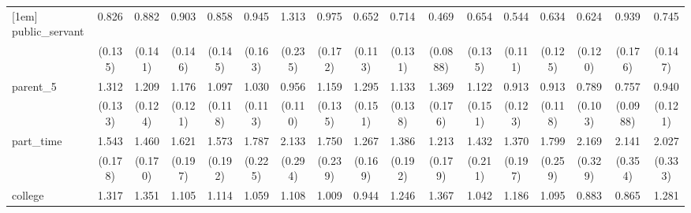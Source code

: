 {\begin{tabular}{l*{16}{c}}
[1em]
public\_servant      &       0.826         &       0.882         &       0.903         &       0.858         &       0.945         &       1.313         &       0.975         &       0.652\sym{*}  &       0.714         &       0.469\sym{***}&       0.654\sym{*}  &       0.544\sym{**} &       0.634\sym{*}  &       0.624\sym{*}  &       0.939         &       0.745         \\
                    &     (0.135)         &     (0.141)         &     (0.146)         &     (0.145)         &     (0.163)         &     (0.235)         &     (0.172)         &     (0.113)         &     (0.131)         &    (0.0888)         &     (0.135)         &     (0.111)         &     (0.125)         &     (0.120)         &     (0.176)         &     (0.147)         \\
[1em]
parent\_5            &       1.312\sym{**} &       1.209         &       1.176         &       1.097         &       1.030         &       0.956         &       1.159         &       1.295\sym{*}  &       1.133         &       1.369\sym{*}  &       1.122         &       0.913         &       0.913         &       0.789         &       0.757\sym{*}  &       0.940         \\
                    &     (0.133)         &     (0.124)         &     (0.121)         &     (0.118)         &     (0.113)         &     (0.110)         &     (0.135)         &     (0.151)         &     (0.138)         &     (0.176)         &     (0.151)         &     (0.123)         &     (0.118)         &     (0.103)         &    (0.0988)         &     (0.121)         \\
[1em]
part\_time           &       1.543\sym{***}&       1.460\sym{**} &       1.621\sym{***}&       1.573\sym{***}&       1.787\sym{***}&       2.133\sym{***}&       1.750\sym{***}&       1.267         &       1.386\sym{*}  &       1.213         &       1.432\sym{*}  &       1.370\sym{*}  &       1.799\sym{***}&       2.169\sym{***}&       2.141\sym{***}&       2.027\sym{***}\\
                    &     (0.178)         &     (0.170)         &     (0.197)         &     (0.192)         &     (0.225)         &     (0.294)         &     (0.239)         &     (0.169)         &     (0.192)         &     (0.179)         &     (0.211)         &     (0.197)         &     (0.259)         &     (0.329)         &     (0.354)         &     (0.333)         \\
[1em]
college             &       1.317\sym{*}  &       1.351\sym{*}  &       1.105         &       1.114         &       1.059         &       1.108         &       1.009         &       0.944         &       1.246         &       1.367         &       1.042         &       1.186         &       1.095         &       0.883         &       0.865         &       1.281         \\

\end{tabular}}
